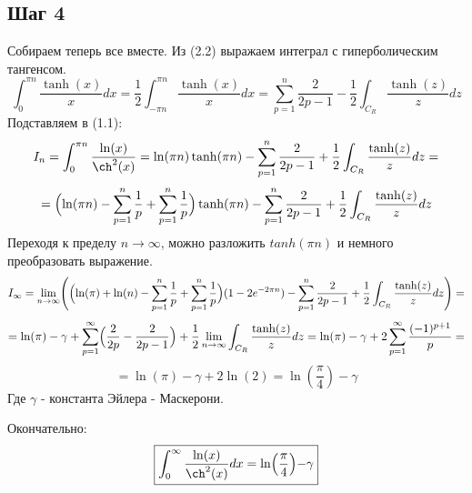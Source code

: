 \documentclass[12pt]{article}
\begin{document}
\subsection*{Шаг 4}
Собираем теперь все вместе. Из (2.2) выражаем интеграл с гиперболическим тангенсом.
\[\int_{0}^{\pi n}\frac{\tanh(x)}{x}dx = \frac{1}{2}\int_{-\pi n}^{\pi n}\frac{\tanh(x)}{x}dx = \sum_{p = 1}^{n} \frac{2}{2p-1} - \frac{1}{2}\int_{C_R}\frac{\tanh(z)}{z}dz \]
Подставляем в (1.1):
\[I_n = \int_{0}^{\pi n}\frac{\ln(x)}{\ch^2(x)} = \ln(\pi n)\tanh(\pi n) - \sum_{p = 1}^{n} \frac{2}{2p-1}+ \frac{1}{2}\int_{C_R}\frac{\tanh(z)}{z}dz = \]
\[ = \Bigl(\ln(\pi n) - \sum_{p=1}^{n} \frac{1}{p} + \sum_{p=1}^{n} \frac{1}{p}\Bigr)\tanh(\pi n) - \sum_{p = 1}^{n} \frac{2}{2p-1}+ \frac{1}{2}\int_{C_R}\frac{\tanh(z)}{z}dz\]
Переходя к пределу $n \rightarrow \infty$, можно разложить $tanh(\pi n)$ и немного преобразовать выражение.
\[I_\infty = \lim\limits_{n \rightarrow \infty} \Biggl(\Bigl(\ln(\pi) + \ln(n) - \sum_{p=1}^{n} \frac{1}{p} + \sum_{p=1}^{n} \frac{1}{p}\Bigr)(1-2e^{-2\pi n}) - \sum_{p = 1}^{n} \frac{2}{2p-1}+ \frac{1}{2}\int_{C_R}\frac{\tanh(z)}{z}dz \Biggr) = \]
\[ =  \ln(\pi) - \gamma  + \sum_{p=1}^{\infty} \Bigl( \frac{2}{2p} - \frac{2}{2p-1} \Bigr) + \frac{1}{2} \lim\limits_{n \rightarrow \infty} \int_{C_R}\frac{\tanh(z)}{z}dz = \ln(\pi) - \gamma + 2 \sum_{p=1}^{\infty} \frac{(-1)^{p+1}}{p} = \]
\[ = \ln(\pi) - \gamma + 2\ln(2) = \ln(\frac{\pi}{4}) - \gamma \]
Где $\gamma$ - константа Эйлера - Маскерони.


Окончательно:
\[
\boxed{	
	\int_{0}^{\infty}\frac{\ln(x)}{\ch^2(x)}dx = \ln\Bigr(\frac{\pi}{4}\Bigl)-\gamma
}
\]
\end{document}

